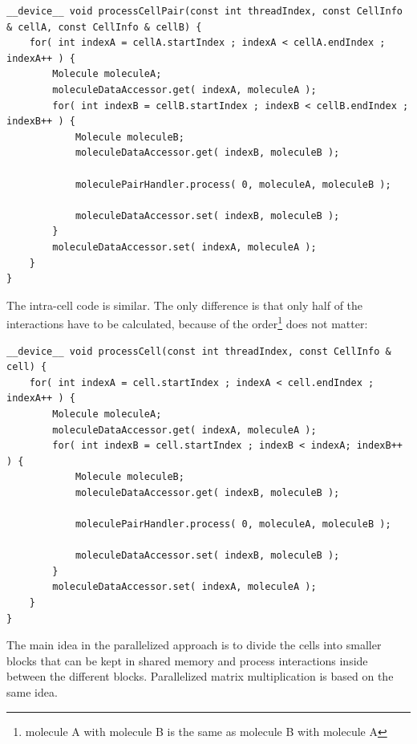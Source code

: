 \begin{lstlisting}[label=intercellreferenceloop,caption=Reference Inter-Cell Block Processing]
__device__ void processCellPair(const int threadIndex, const CellInfo & cellA, const CellInfo & cellB) {
	for( int indexA = cellA.startIndex ; indexA < cellA.endIndex ; indexA++ ) {
		Molecule moleculeA;
		moleculeDataAccessor.get( indexA, moleculeA );
		for( int indexB = cellB.startIndex ; indexB < cellB.endIndex ; indexB++ ) {
			Molecule moleculeB;
			moleculeDataAccessor.get( indexB, moleculeB );

			moleculePairHandler.process( 0, moleculeA, moleculeB );

			moleculeDataAccessor.set( indexB, moleculeB );
		}
		moleculeDataAccessor.set( indexA, moleculeA );
	}
}
\end{lstlisting}
The intra-cell code is similar. The only difference is that only half of the interactions have to be calculated, because of the order\footnote{molecule A with molecule B is the same as molecule B with molecule A} does not matter:
\begin{lstlisting}[label=intracellreferenceloop,caption=Reference Intra-Cell Block Processing]
__device__ void processCell(const int threadIndex, const CellInfo & cell) {
	for( int indexA = cell.startIndex ; indexA < cell.endIndex ; indexA++ ) {
		Molecule moleculeA;
		moleculeDataAccessor.get( indexA, moleculeA );
		for( int indexB = cell.startIndex ; indexB < indexA; indexB++ ) {
			Molecule moleculeB;
			moleculeDataAccessor.get( indexB, moleculeB );

			moleculePairHandler.process( 0, moleculeA, moleculeB );

			moleculeDataAccessor.set( indexB, moleculeB );
		}
		moleculeDataAccessor.set( indexA, moleculeA );
	}
}
\end{lstlisting}

The main idea in the parallelized approach is to divide the cells into smaller blocks that can be kept in shared memory and process interactions inside between the different blocks. Parallelized matrix multiplication is based on the same idea. 

